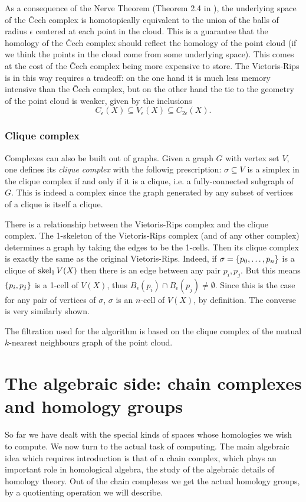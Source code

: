 \documentclass[../main.tex]{subfiles}
\begin{document}
As a consequence of the Nerve Theorem (Theorem 2.4 in \cite{ghrist}), the underlying space
of the Čech complex is homotopically equivalent to the union of the balls of radius \(
\epsilon \) centered at each point in the cloud. This is a guarantee that the homology of
the Čech complex should reflect the homology of the point cloud (if we think the points in
the cloud come from some underlying space). This comes at the cost of the Čech complex
being more expensive to store. The Vietoris-Rips is in this way requires a tradeoff: on
the one hand it is much less memory intensive than the Čech complex, but on the other hand
the tie to the geometry of the point cloud is weaker, given by the inclusions
\begin{equation*}
	C_\epsilon(X) \subseteq V_\epsilon(X) \subseteq C_{2\epsilon}(X). 
\end{equation*}


\subsubsection{Clique complex} \label{sec:clique complex}
Complexes can also be built out of graphs. Given a graph \( G \) with vertex set \( V \),
one defines its \emph{clique complex} with the followig prescription: \( \sigma
\subseteq V \) is a simplex in the clique complex if and only if it is a clique, i.e. a
fully-connected subgraph of \( G \). This is indeed a complex since the graph generated by
any subset of vertices of a clique is itself a clique.

There is a relationship between the Vietoris-Rips complex and the clique complex. The
1-skeleton of the Vietoris-Rips complex (and of any other complex) determines a graph by
taking the edges to be the 1-cells. Then its clique complex is exactly the same as the
original Vietoris-Rips. Indeed, if \( \sigma = \left\{ p_0, \dots, p_n \right\} \) is a clique of \(
\operatorname{skel}_1{V(X)} \) then there is an edge between any pair \( p_i, p_j \). But this means
\( \left\{ p_i, p_j \right\} \) is a 1-cell of \( V(X) \), thus \( B_\epsilon(p_i) \cap
B_\epsilon(p_j) \neq \emptyset \). Since this is the case for any pair of vertices of \(
\sigma \), \( \sigma \) is an \( n \)-cell of \( V(X) \), by definition. The converse
is very similarly shown. 

The filtration used for the algorithm is based on the clique complex of the mutual \( k
\)-nearest neighbours graph of the point cloud. 

\section{The algebraic side: chain complexes and homology groups}\label{sec:algebraic
side}
So far we have dealt with the special kinds of spaces whose homologies we wish to compute.
We now turn to the actual task of computing. The main algebraic idea which requires
introduction is that of a chain complex, which plays an important role in homological
algebra, the study of the algebraic details of homology theory. Out of the chain
complexes we get the actual homology groups, by a quotienting operation we will describe.
\end{document}
